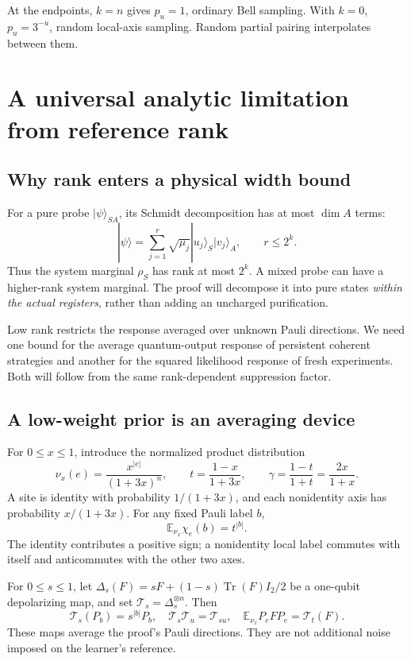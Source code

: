 \documentclass[11pt,a4paper]{article}
\numberwithin{equation}{section}
\theoremstyle{definition}
\theoremstyle{remark}
\begin{document}
At the endpoints, \(k=n\) gives \(p_u=1\), ordinary Bell sampling. With \(k=0\), \(p_u=3^{-u}\), random local-axis sampling. Random partial pairing interpolates between them.

\section{A universal analytic limitation from reference rank}
\subsection{Why rank enters a physical width bound}
For a pure probe \(|\psi\rangle_{SA}\), its Schmidt decomposition has at most \(\dim A\) terms:
\[
 |\psi\rangle=\sum_{j=1}^{r}\sqrt{\mu_j}|u_j\rangle_S|v_j\rangle_A,
 \qquad r\leq2^k.
\]
Thus the system marginal \(\rho_S\) has rank at most \(2^k\). A mixed probe can have a higher-rank system marginal. The proof will decompose it into pure states \emph{within the actual registers}, rather than adding an uncharged purification.

Low rank restricts the response averaged over unknown Pauli directions. We need one bound for the average quantum-output response of persistent coherent strategies and another for the squared likelihood response of fresh experiments. Both will follow from the same rank-dependent suppression factor.

\subsection{A low-weight prior is an averaging device}
For \(0\leq x\leq1\), introduce the normalized product distribution
\begin{equation}
 \nu_x(e)=\frac{x^{|e|}}{(1+3x)^n},\qquad
 t=\frac{1-x}{1+3x},\qquad
 \gamma=\frac{1-t}{1+t}=\frac{2x}{1+x}.
 \label{eq:plmt-prior}
\end{equation}
A site is identity with probability \(1/(1+3x)\), and each nonidentity axis has probability \(x/(1+3x)\). For any fixed Pauli label \(b\),
\[
 \mathbb E_{\nu_x}\chi_e(b)=t^{|b|}.
\]
The identity contributes a positive sign; a nonidentity local label commutes with itself and anticommutes with the other two axes.

For \(0\leq s\leq1\), let \(\Delta_s(F)=sF+(1-s)\operatorname{Tr}(F)I_2/2\) be a one-qubit depolarizing map, and set \(\mathcal T_s=\Delta_s^{\otimes n}\). Then
\begin{equation}
 \mathcal T_s(P_b)=s^{|b|}P_b,\quad
 \mathcal T_s\mathcal T_u=\mathcal T_{su},\quad
 \mathbb E_{\nu_x}P_eFP_e=\mathcal T_t(F).
 \label{eq:plmt-averaging}
\end{equation}
These maps average the proof's Pauli directions. They are not additional noise imposed on the learner's reference.
\end{document}
